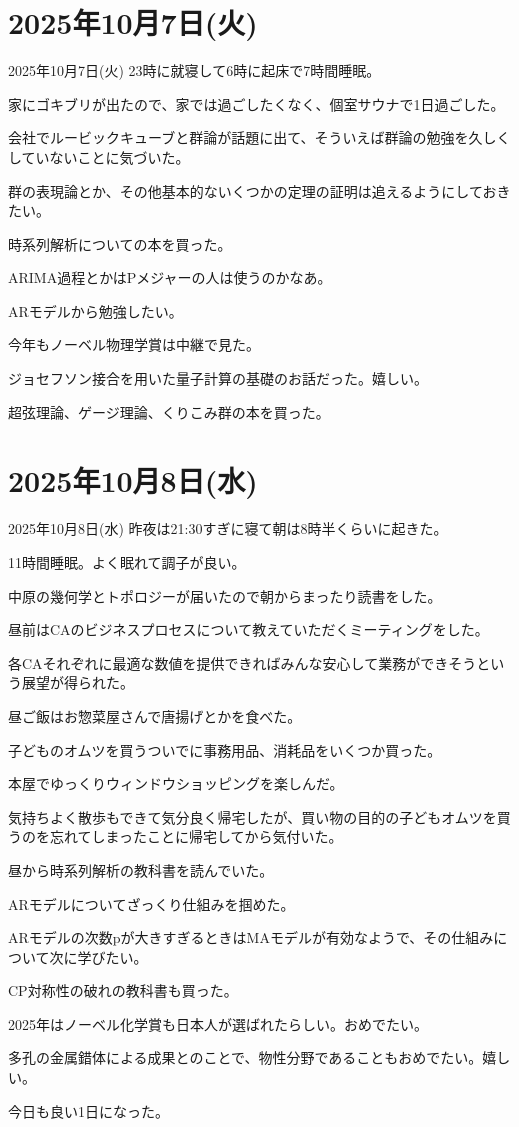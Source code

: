 \documentclass[dvipdfmx, autodetect-engine, aspectratio=169, 10.5pt]{beamer}
\begin{document}
\section{2025年10月7日(火)}

\begin{frame}{2025年10月7日(火)}
	23時に就寝して6時に起床で7時間睡眠。

	家にゴキブリが出たので、家では過ごしたくなく、個室サウナで1日過ごした。

	会社でルービックキューブと群論が話題に出て、そういえば群論の勉強を久しくしていないことに気づいた。

	群の表現論とか、その他基本的ないくつかの定理の証明は追えるようにしておきたい。

	時系列解析についての本を買った。

	ARIMA過程とかはPメジャーの人は使うのかなあ。

	ARモデルから勉強したい。

	今年もノーベル物理学賞は中継で見た。

	ジョセフソン接合を用いた量子計算の基礎のお話だった。嬉しい。

	超弦理論、ゲージ理論、くりこみ群の本を買った。
\end{frame}

\section{2025年10月8日(水)}

\begin{frame}{2025年10月8日(水)}
	\scriptsize
	昨夜は21:30すぎに寝て朝は8時半くらいに起きた。

	11時間睡眠。よく眠れて調子が良い。

	中原の幾何学とトポロジーが届いたので朝からまったり読書をした。

	昼前はCAのビジネスプロセスについて教えていただくミーティングをした。

	各CAそれぞれに最適な数値を提供できればみんな安心して業務ができそうという展望が得られた。

	昼ご飯はお惣菜屋さんで唐揚げとかを食べた。

	子どものオムツを買うついでに事務用品、消耗品をいくつか買った。

	本屋でゆっくりウィンドウショッピングを楽しんだ。

	気持ちよく散歩もできて気分良く帰宅したが、買い物の目的の子どもオムツを買うのを忘れてしまったことに帰宅してから気付いた。

	昼から時系列解析の教科書を読んでいた。

	ARモデルについてざっくり仕組みを掴めた。

	ARモデルの次数pが大きすぎるときはMAモデルが有効なようで、その仕組みについて次に学びたい。

	CP対称性の破れの教科書も買った。

	2025年はノーベル化学賞も日本人が選ばれたらしい。おめでたい。

	多孔の金属錯体による成果とのことで、物性分野であることもおめでたい。嬉しい。

	今日も良い1日になった。
\end{frame}
\end{document}
